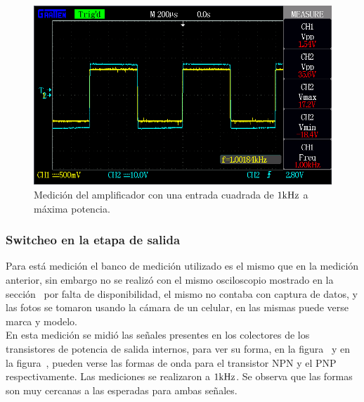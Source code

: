 \begin{figure}[H]
        \centering
        \includegraphics[width=0.95 \textwidth]{./img/mediciones/Power/2.png}
        \caption{Medición del amplificador con una entrada cuadrada de $1 \si[per-mode=symbol]{\kilo\hertz}$ a máxima potencia.}
        \label{fig:estab2}
\end{figure}

\vfill

\clearpage

\subsubsection{Switcheo en la etapa de salida}

Para está medición el banco de medición utilizado es el mismo que en la medición anterior, sin embargo no se realizó con el mismo osciloscopio mostrado en la sección~ por falta de disponibilidad, el mismo no contaba con captura de datos, y las fotos se tomaron usando la cámara de un celular, en las mismas puede verse marca y modelo.\\

En esta medición se midió las señales presentes en los colectores de los transistores de potencia de salida internos, para ver su forma, en la figura~ y en la figura~, pueden verse las formas de onda para el transistor NPN y el PNP respectivamente. Las mediciones se realizaron a $1 \si[per-mode=symbol]{\kilo\hertz}$. Se observa que las formas son muy cercanas a las esperadas para ambas señales.\\


